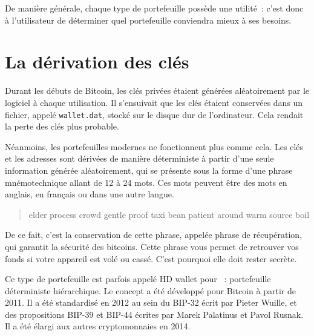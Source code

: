 De manière générale, chaque type de portefeuille possède une utilité~: c'est donc à l'utilisateur de déterminer quel portefeuille conviendra mieux à ses besoins.

\section*{La dérivation des clés}


Durant les débuts de Bitcoin, les clés privées étaient générées aléatoirement par le logiciel à chaque utilisation. Il s'ensuivait que les clés étaient conservées dans un fichier, appelé \texttt{wallet.dat}, stocké sur le disque dur de l'ordinateur. Cela rendait la perte des clés plus probable.

Néanmoins, les portefeuilles modernes ne fonctionnent plus comme cela. Les clés et les adresses sont dérivées de manière déterministe à partir d'une seule information générée aléatoirement, qui se présente sous la forme d'une phrase mnémotechnique allant de 12 à 24 mots. Ces mots peuvent être des mots en anglais, en français ou dans une autre langue.


\begin{quote}
elder process crowd gentle proof taxi bean patient around warm source boil
\end{quote}

De ce fait, c'est la conservation de cette phrase, appelée phrase de récupération, qui garantit la sécurité des bitcoins. Cette phrase vous permet de retrouver vos fonds si votre appareil est volé ou cassé. C'est pourquoi elle doit rester secrète. %

Ce type de portefeuille est parfois appelé HD wallet pour ~: portefeuille déterministe hiérarchique. Le concept a été développé pour Bitcoin à partir de 2011. Il a été standardisé en 2012 au sein du BIP-32 écrit par Pieter Wuille, et des propositions BIP-39 et BIP-44 écrites par Marek Palatinus et Pavol Rusnak. Il a été élargi aux autres cryptomonnaies en 2014.

